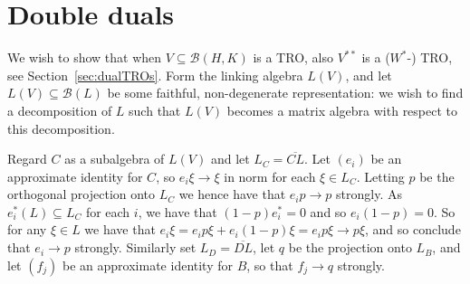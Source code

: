 \documentclass[a4paper,11pt]{article}
\theoremstyle{plain}
\theoremstyle{remark}
\newcommand{\mc}[1]{\mathcal{#1}}
\begin{document}
\section{Double duals}\label{sec:biduals}

We wish to show that when $V\subseteq\mc B(H,K)$ is a TRO, also $V^{**}$ is a ($W^*$-) TRO, see Section~\ref{sec:dualTROs}.  Form the linking algebra $L(V)$, and let $L(V)\subseteq\mc B(L)$ be some faithful, non-degenerate representation: we wish to find a decomposition of $L$ such that $L(V)$ becomes a matrix algebra with respect to this decomposition.

Regard $C$ as a subalgebra of $L(V)$ and let $L_C = \overline{CL}$.  Let $(e_i)$ be an approximate identity for $C$, so $e_i \xi \to \xi$ in norm for each $\xi\in L_C$.  Letting $p$ be the orthogonal projection onto $L_C$ we hence have that $e_i p \to p$ strongly.  As $e_i^*(L) \subseteq L_C$ for each $i$, we have that $(1-p)e_i^*=0$ and so $e_i(1-p)=0$.  So for any $\xi\in L$ we have that $e_i\xi = e_ip\xi + e_i(1-p)\xi = e_ip\xi \to p\xi$, and so conclude that $e_i\to p$ strongly.  Similarly set $L_D = \overline{DL}$, let $q$ be the projection onto $L_B$, and let $(f_j)$ be an approximate identity for $B$, so that $f_j \to q$ strongly.
\end{document}
